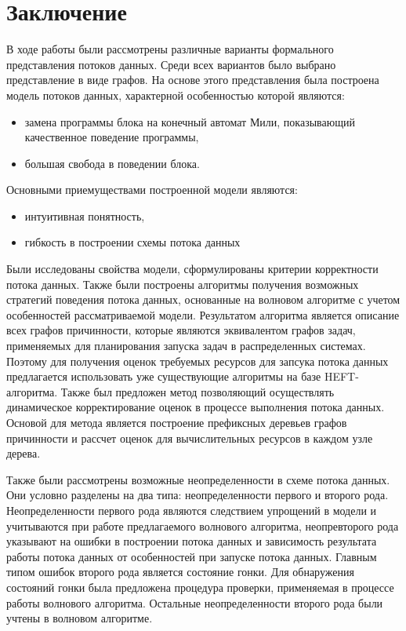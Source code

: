 \documentclass[10pt,a4paper]{article}
\begin{document}
\section{Заключение}
  В ходе работы были рассмотрены различные варианты формального представления потоков данных.
  Среди всех вариантов было выбрано представление в виде графов. На основе этого представления
  была построена модель потоков данных, характерной особенностью которой являются:
  \begin{itemize}
    \item замена программы блока на конечный автомат Мили, показывающий качественное поведение программы,
    \item большая свобода в поведении блока.
  \end{itemize}
  
  Основными приемуществами построенной модели являются:
  \begin{itemize}
    \item интуитивная понятность,
    \item гибкость в построении схемы потока данных
  \end{itemize}
  
  Были исследованы свойства модели, сформулированы критерии корректности потока данных.
  Также были построены алгоритмы получения возможных стратегий поведения потока данных,
  основанные на волновом алгоритме с учетом особенностей рассматриваемой модели.
  Результатом алгоритма является описание всех графов причинности, которые являются эквивалентом графов задач,
  применяемых для планирования запуска задач в распределенных системах.
  Поэтому для получения оценок требуемых ресурсов для запсука потока данных
  предлагается использовать уже существующие алгоритмы на базе HEFT-алгоритма.
  Также был предложен метод позволяющий осуществлять динамическое корректирование оценок в процессе выполнения потока данных.
  Основой для метода является построение префиксных деревьев графов причинности и рассчет оценок для вычислительных ресурсов в каждом узле дерева.
    
  Также были рассмотрены возможные неопределенности в схеме потока данных. Они условно разделены на два типа: неопределенности первого и второго рода.
  Неопределенности первого рода являются следствием упрощений в модели и учитываются при работе предлагаемого волнового алгоритма, неопревторого рода
  указывают на ошибки в построении потока данных и зависимость результата работы потока данных от особенностей при запуске потока данных.
  Главным типом ошибок второго рода является состояние гонки. Для обнаружения состояний гонки была предложена процедура проверки, применяемая
  в процессе работы волнового алгоритма. Остальные неопределенности второго рода были учтены в волновом алгоритме.
  
\end{document}
